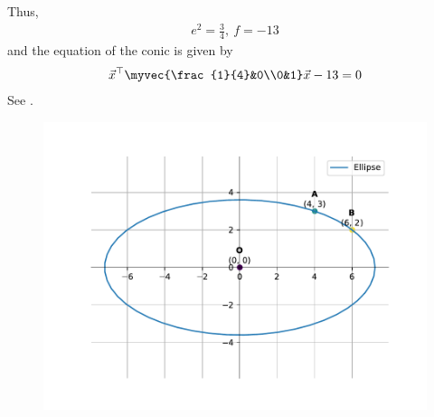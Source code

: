     Thus,
    \begin{align}
        e^2 = \frac{3}{4},\ f = -13
    \end{align}
    and the equation of the conic is given by
    \begin{align}
        \vec{x}^\top\myvec{\frac{1}{4}&0\\0&1}\vec{x} - 13 = 0
    \end{align}
    See .
    \begin{figure}[H]
        \centering
        \includegraphics[width=0.75\columnwidth]{chapters/11/11/3/20/figs/fig.pdf}
        \caption{}
        \label{fig:chapters/11/11/3/20/ellipse}
    \end{figure}
